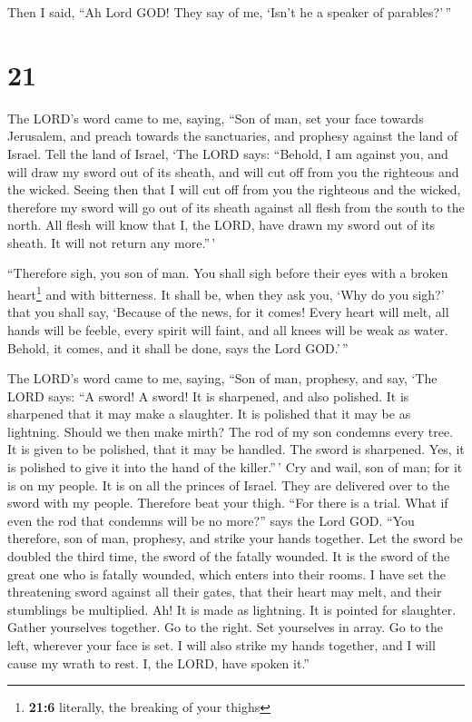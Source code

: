  Then I said, ``Ah Lord GOD! They say of me, `Isn't he a
speaker of parables?'\,''

\hypertarget{section-19}{%
\section{21}\label{section-19}}

 The LORD's word came to me, saying,  ``Son
of man, set your face towards Jerusalem, and preach towards the
sanctuaries, and prophesy against the land of Israel. 
Tell the land of Israel, `The LORD says: ``Behold, I am against you, and
will draw my sword out of its sheath, and will cut off from you the
righteous and the wicked.  Seeing then that I will cut off
from you the righteous and the wicked, therefore my sword will go out of
its sheath against all flesh from the south to the north. 
All flesh will know that I, the LORD, have drawn my sword out of its
sheath. It will not return any more.''\,'

 ``Therefore sigh, you son of man. You shall sigh before
their eyes with a broken heart\footnote{\textbf{21:6} literally, the
  breaking of your thighs} and with bitterness.  It shall
be, when they ask you, `Why do you sigh?' that you shall say, `Because
of the news, for it comes! Every heart will melt, all hands will be
feeble, every spirit will faint, and all knees will be weak as water.
Behold, it comes, and it shall be done, says the Lord GOD.'\,''

 The LORD's word came to me, saying,  ``Son
of man, prophesy, and say, `The LORD says: ``A sword! A sword! It is
sharpened, and also polished.  It is sharpened that it
may make a slaughter. It is polished that it may be as lightning. Should
we then make mirth? The rod of my son condemns every tree.
 It is given to be polished, that it may be handled. The
sword is sharpened. Yes, it is polished to give it into the hand of the
killer.''\,'  Cry and wail, son of man; for it is on my
people. It is on all the princes of Israel. They are delivered over to
the sword with my people. Therefore beat your thigh. 
``For there is a trial. What if even the rod that condemns will be no
more?'' says the Lord GOD.  ``You therefore, son of man,
prophesy, and strike your hands together. Let the sword be doubled the
third time, the sword of the fatally wounded. It is the sword of the
great one who is fatally wounded, which enters into their rooms.
 I have set the threatening sword against all their
gates, that their heart may melt, and their stumblings be multiplied.
Ah! It is made as lightning. It is pointed for slaughter.
 Gather yourselves together. Go to the right. Set
yourselves in array. Go to the left, wherever your face is set.
 I will also strike my hands together, and I will cause
my wrath to rest. I, the LORD, have spoken it.''

